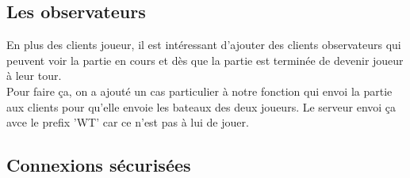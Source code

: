 \documentclass[12pt]{article}
\begin{document}
\subsection{Les observateurs}
\textnormal{
En plus des clients joueur, il est intéressant d'ajouter des clients observateurs qui peuvent voir la partie en cours et dès que la partie est terminée de devenir joueur à leur tour.\\
Pour faire ça, on a ajouté un cas particulier à notre fonction qui envoi la partie aux clients pour qu'elle envoie les bateaux des deux joueurs. Le serveur envoi ça avce le prefix 'WT' car ce n'est pas à lui de jouer.
}

\subsection{Connexions sécurisées}
\end{document}
